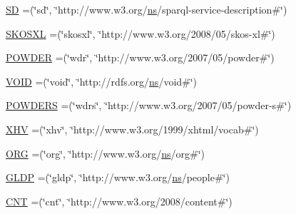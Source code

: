 \begin{DoxyCompactItemize}
\item 
\hyperlink{enumorg_1_1semanticweb_1_1owlapi_1_1vocab_1_1_namespaces_a0980c237b70f6a08ad2771476d740c98}{S\-D} =(\char`\"{}sd\char`\"{}, \char`\"{}http\-://www.\-w3.\-org/\hyperlink{enumorg_1_1semanticweb_1_1owlapi_1_1vocab_1_1_namespaces_a88428054d2db7e7520b71b395aef20ac}{ns}/sparql-\/service-\/description\#\char`\"{})
\item 
\hyperlink{enumorg_1_1semanticweb_1_1owlapi_1_1vocab_1_1_namespaces_a764cd936be8044d883a5c99766eefea6}{S\-K\-O\-S\-X\-L} =(\char`\"{}skosxl\char`\"{}, \char`\"{}http\-://www.\-w3.\-org/2008/05/skos-\/xl\#\char`\"{})
\item 
\hyperlink{enumorg_1_1semanticweb_1_1owlapi_1_1vocab_1_1_namespaces_a37ccaab81636975dc93bfc1100749498}{P\-O\-W\-D\-E\-R} =(\char`\"{}wdr\char`\"{}, \char`\"{}http\-://www.\-w3.\-org/2007/05/powder\#\char`\"{})
\item 
\hyperlink{enumorg_1_1semanticweb_1_1owlapi_1_1vocab_1_1_namespaces_ad74d6d9013c1c795f549665402100ebd}{V\-O\-I\-D} =(\char`\"{}void\char`\"{}, \char`\"{}http\-://rdfs.\-org/\hyperlink{enumorg_1_1semanticweb_1_1owlapi_1_1vocab_1_1_namespaces_a88428054d2db7e7520b71b395aef20ac}{ns}/void\#\char`\"{})
\item 
\hyperlink{enumorg_1_1semanticweb_1_1owlapi_1_1vocab_1_1_namespaces_a1d06ba5e08fa2fcc84457301615e3232}{P\-O\-W\-D\-E\-R\-S} =(\char`\"{}wdrs\char`\"{}, \char`\"{}http\-://www.\-w3.\-org/2007/05/powder-\/s\#\char`\"{})
\item 
\hyperlink{enumorg_1_1semanticweb_1_1owlapi_1_1vocab_1_1_namespaces_ac8b1d496f4d18244d0bcb85e8860e61e}{X\-H\-V} =(\char`\"{}xhv\char`\"{}, \char`\"{}http\-://www.\-w3.\-org/1999/xhtml/vocab\#\char`\"{})
\item 
\hyperlink{enumorg_1_1semanticweb_1_1owlapi_1_1vocab_1_1_namespaces_a9b9a9e25538e7b9d7a2233ce857ac8a9}{O\-R\-G} =(\char`\"{}org\char`\"{}, \char`\"{}http\-://www.\-w3.\-org/\hyperlink{enumorg_1_1semanticweb_1_1owlapi_1_1vocab_1_1_namespaces_a88428054d2db7e7520b71b395aef20ac}{ns}/org\#\char`\"{})
\item 
\hyperlink{enumorg_1_1semanticweb_1_1owlapi_1_1vocab_1_1_namespaces_aff32223f827da7a1a248167e9bd140a8}{G\-L\-D\-P} =(\char`\"{}gldp\char`\"{}, \char`\"{}http\-://www.\-w3.\-org/\hyperlink{enumorg_1_1semanticweb_1_1owlapi_1_1vocab_1_1_namespaces_a88428054d2db7e7520b71b395aef20ac}{ns}/people\#\char`\"{})
\item 
\hyperlink{enumorg_1_1semanticweb_1_1owlapi_1_1vocab_1_1_namespaces_a35facdb7a8b9f61c2c675fa46943a9be}{C\-N\-T} =(\char`\"{}cnt\char`\"{}, \char`\"{}http\-://www.\-w3.\-org/2008/content\#\char`\"{})

\end{DoxyCompactItemize}
